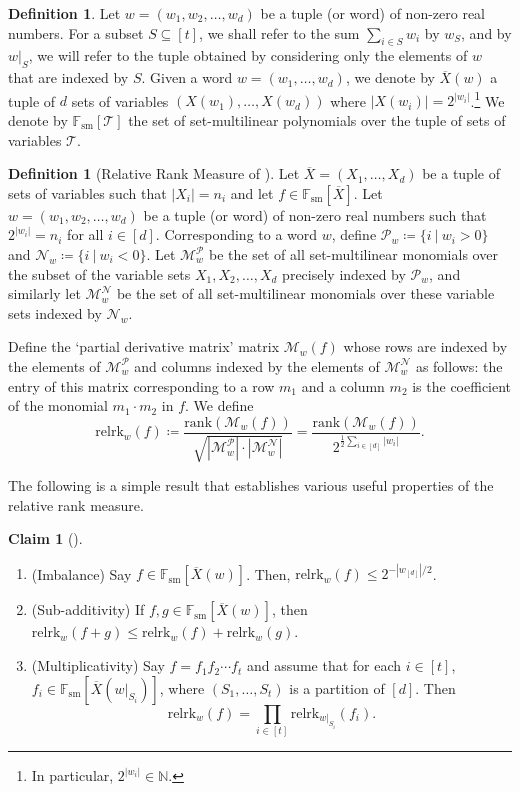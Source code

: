 \documentclass[10pt,a4paper]{article}
\theoremstyle{definition}%
\newtheorem{claim}[theorem]{Claim}
\newtheorem{definition}[theorem]{Definition}
\theoremstyle{plain}
\newcommand{\rk}{\mathrm{relrk}}
\newcommand{\Fsm}{\mathbb{F}_{\mathrm{sm}}}
\newcommand{\ol}[1]{\overline{#1}}
\newcommand{\calM}{\mathcal{M}}
\newcommand{\calN}{\mathcal{N}}
\newcommand{\calP}{\mathcal{P}}
\newcommand{\calT}{\mathcal{T}}
\begin{document}
\begin{definition}\label{def:rk-rest}
Let $w = (w_1, w_2,\ldots, w_d)$ be a tuple (or word) of non-zero real numbers. For a subset $S \subseteq [t]$, we shall refer to the sum $\sum_{i\in S} w_i$ by $w_S$,  and by $w|_S$, we will refer to the tuple obtained by considering only the
elements of $w$ that are indexed by $S$. 
Given a word $w=(w_1,\ldots,w_d)$, we denote by $\ol{X}(w)$ a tuple of $d$ sets of variables $(X(w_1),\ldots,X(w_d))$ where
$|X(w_i)| = 2^{|w_i|}$.\footnote{In particular, $2^{|w_i|}\in\mathbb{N}$.}
We denote by $\Fsm[\calT]$ the set of set-multilinear polynomials over the tuple
of sets of variables $\calT$.
\end{definition}


\begin{definition}[Relative Rank Measure of \cite{LST1}]\label{def:relrk}
Let $\ol{X}=(X_1,\ldots,X_d)$ be a tuple of sets of variables such that $|X_i|=n_i$ and let $f\in \Fsm[\ol{X}]$.
 Let $w = (w_1, w_2,\ldots, w_d)$ be a tuple (or word) of non-zero real numbers such that $2^{|w_i|}  = n_i $ for all $i \in [d]$. Corresponding to a word $w$, define $\calP_w \coloneqq \{i\ |\ w_i > 0\}$ and $\calN_w \coloneqq \{i\ |\ w_i < 0\}$. Let $\calM^{\calP}_{w}$ be the
set of all set-multilinear monomials over the subset of the variable sets $X_1, X_2,\ldots, X_d$ precisely
indexed by $\calP_w$, and similarly let $\calM^{\calN}_{w}$ be the set of all set-multilinear monomials over these variable
sets indexed by $\calN_w$.

Define the ‘partial derivative matrix’ matrix $\calM_w(f)$ whose rows are indexed by the elements
of $\calM^{\calP}_w$ and columns indexed by the elements of $\calM^{\calN}_{w}$ as follows: the entry of this matrix corresponding to a
row $m_1$ and a column $m_2$ is the coefficient of the monomial $m_1\cdot m_2$ in $f$. We define
\[
\rk_w(f) \coloneqq \frac{\mathrm{rank}(\calM_w(f))}{\sqrt{|\calM^{\calP}_w|\cdot |\calM^{\calN}_w|}} = \frac{\mathrm{rank}(\calM_w(f))}{2^{\frac{1}{2}\sum_{i\in[d]}|w_i|}}.
\]
\end{definition}


The following is a simple result that establishes various useful properties of the relative rank measure.
\begin{claim}[\cite{LST1}]\label{clm:rk-props}
\begin{enumerate}
    \item(Imbalance) Say $f \in \Fsm[\ol{X}(w)]$. Then, $\rk_w(f)\leq 2^{-|w_{[d]}|/2}$.
    \item(Sub-additivity) If $f,g \in \Fsm[\ol{X}(w)]$, then $\rk_w(f+g)\leq \rk_w(f)+\rk_w(g)$.
    \item(Multiplicativity) Say $f = f_1 f_2\cdots f_t $ and assume that for each $i\in [t]$, $f_i\in \Fsm[\ol{X}(w|_{S_i})]$, where $(S_1, \ldots, S_t)$ is a partition of $[d]$. Then
    \[
    \rk_w(f) = \prod_{i\in[t]} \rk_{w|_{S_i}}(f_i).
    \]
\end{enumerate}
\end{claim}
\end{document}
